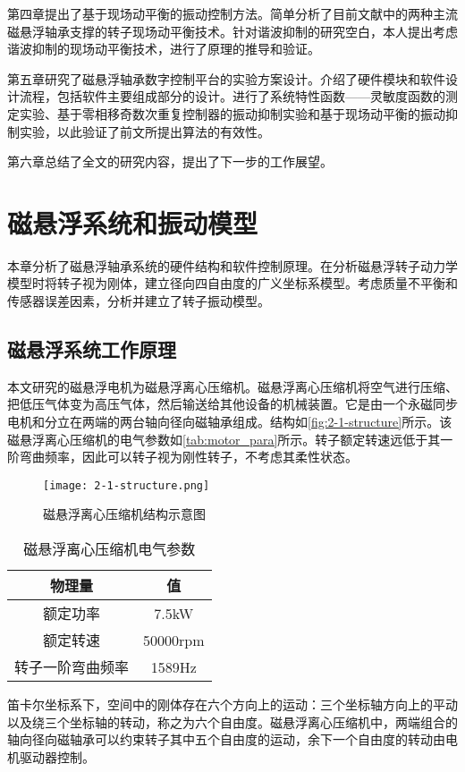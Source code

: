 第四章提出了基于现场动平衡的振动控制方法。简单分析了目前文献中的两种主流磁悬浮轴承支撑的转子现场动平衡技术。针对谐波抑制的研究空白，本人提出考虑谐波抑制的现场动平衡技术，进行了原理的推导和验证。

第五章研究了磁悬浮轴承数字控制平台的实验方案设计。介绍了硬件模块和软件设计流程，包括软件主要组成部分的设计。进行了系统特性函数——灵敏度函数的测定实验、基于零相移奇数次重复控制器的振动抑制实验和基于现场动平衡的振动抑制实验，以此验证了前文所提出算法的有效性。

第六章总结了全文的研究内容，提出了下一步的工作展望。

\chapter{磁悬浮系统和振动模型}
本章分析了磁悬浮轴承系统的硬件结构和软件控制原理。在分析磁悬浮转子动力学模型时将转子视为刚体，建立径向四自由度的广义坐标系模型。考虑质量不平衡和传感器误差因素，分析并建立了转子振动模型。

\section{磁悬浮系统工作原理}
本文研究的磁悬浮电机为磁悬浮离心压缩机。磁悬浮离心压缩机将空气进行压缩、把低压气体变为高压气体，然后输送给其他设备的机械装置。它是由一个永磁同步电机和分立在两端的两台轴向径向磁轴承组成。结构如\autoref{fig:2-1-structure}所示。该磁悬浮离心压缩机的电气参数如\autoref{tab:motor_para}所示。转子额定转速远低于其一阶弯曲频率，因此可以转子视为刚性转子，不考虑其柔性状态。

\begin{figure}
	\texttt{[image: 2-1-structure.png]}
	\caption{磁悬浮离心压缩机结构示意图}
	\label{fig:2-1-structure}
\end{figure}

\begin{table}[htb]
  \caption[磁悬浮离心压缩机电气参数]{磁悬浮离心压缩机电气参数\label{tab:motor_para}}
  \begin{tabular}{cc}
    \toprule
    物理量 & 值 \\
    \midrule
    额定功率 & 7.5kW\\
    额定转速 & 50000rpm\\
    转子一阶弯曲频率 & 1589Hz\\
    \bottomrule
  \end{tabular}
\end{table}

笛卡尔坐标系下，空间中的刚体存在六个方向上的运动：三个坐标轴方向上的平动以及绕三个坐标轴的转动，称之为六个自由度。磁悬浮离心压缩机中，两端组合的轴向径向磁轴承可以约束转子其中五个自由度的运动，余下一个自由度的转动由电机驱动器控制。

